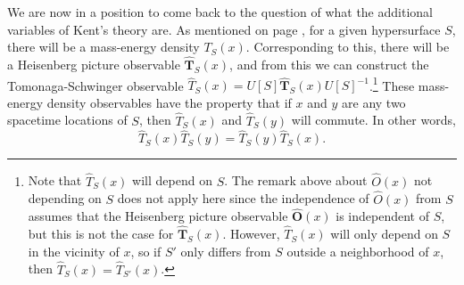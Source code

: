 \documentclass[12pt]{report}
\begin{document}
We are now in a position to come back to the question of what the additional variables of Kent's theory are. As mentioned on page \pageref{massenergydensity}, for a given hypersurface $S$,  there will be a mass-energy density $T_S(x)$. Corresponding to this, there will be a Heisenberg picture observable $\hat{\bm{T}}_S(x)$, %
%
 and from this we can construct the Tomonaga-Schwinger observable $\hat{T}_S(x)=U[S]\hat{\bm{T}}_S(x)U[S]^{-1}$.\footnote{Note that $\hat{T}_S(x)$ will depend on $S$. The remark above about $\hat{O}(x)$ not depending on $S$ does not apply here since the independence of $\hat{O}(x)$ from $S$ assumes that the Heisenberg picture observable $\hat{\bm{O}}(x)$ is independent of $S$, but this is not the case for  $\hat{\bm{T}}_S(x)$. However,  $\hat{T}_S(x)$ will only depend on $S$ in the vicinity of $x$, so if $S'$ only differs from $S$ outside a neighborhood of $x$, then $\hat{T}_S(x) =\hat{T}_{S'}(x)$.} These mass-energy density observables have the property that if $x$ and $y$ are any two spacetime locations of $S$, then $\hat{T}_S(x)$ and $\hat{T}_S(y)$ will commute. In other words,
$$\hat{T}_S(x)\hat{T}_S(y)=\hat{T}_S(y)\hat{T}_S(x).$$
\end{document}
